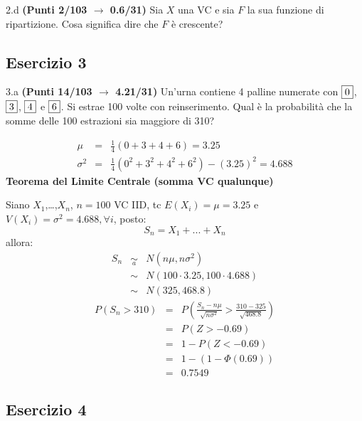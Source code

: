 \documentclass[
  11pt,
]{book}
\theoremstyle{mytheoremstyle}
\theoremstyle{mydefstyle}
\newenvironment{sol}
  {
  \begin{tcolorbox}[enhanced,breakable,arc=0.1mm,boxrule=1pt,colback=white,colframe=iblue,
  title=\bf \fontfamily{lmss}\selectfont \hspace{.5 cm} Soluzione,drop fuzzy shadow]

}{
\end{tcolorbox}
  }
\begin{document}
2.d \textbf{(Punti 2/103 \(\rightarrow\) 0.6/31)} Sia \(X\) una VC e sia \(F\) la sua funzione di ripartizione. Cosa significa dire che \(F\) è crescente?

\subsection{Esercizio 3}\label{esercizio-3-19}

3.a \textbf{(Punti 14/103 \(\rightarrow\) 4.21/31)} Un'urna contiene 4 palline numerate con \(\fbox{0}\), \(\fbox{3}\), \(\fbox{4}\) e \(\fbox{6}\). Si estrae 100 volte con reinserimento. Qual è la probabilità che la somme delle 100 estrazioni sia maggiore di 310?

\begin{sol}
\begin{eqnarray*}
 \mu &=& \frac 1{ 4 }(  0 + 3 + 4 + 6  )= 3.25 \\ 
 \sigma^2 &=& \frac 1{ 4 }(  0 ^2+ 3 ^2+ 4 ^2+ 6 ^2 )-( 3.25 )^2= 4.688 
\end{eqnarray*}
\textbf{Teorema del Limite Centrale (somma VC qualunque)}

Siano \(X_1\),\ldots,\(X_n\), \(n=100\) VC IID, tc \(E(X_i)=\mu=3.25\) e \(V(X_i)=\sigma^2=4.688,\forall i\), posto:
\[
      S_n = X_1 + ... + X_n
      \]
allora:\begin{eqnarray*}
  S_n & \mathop{\sim}\limits_{a}& N(n\mu,n\sigma^2) \\
     &\sim & N(100\cdot3.25,100\cdot4.688) \\
     &\sim & N(325,468.8) 
  \end{eqnarray*}\begin{eqnarray*}
      P( S_n   >   310 ) 
        &=& P\left(  \frac { S_n  -  n\mu }{ \sqrt{n\sigma^2} }  >  \frac { 310  -  325 }{\sqrt{ 468.8 }} \right)  \\
                 &=& P\left(  Z   >   -0.69 \right) \\    &=& 1-P(Z< -0.69 )\\ 
                 &=&  1-(1-\Phi( 0.69 )) \\ &=&  0.7549 
      \end{eqnarray*}

\end{sol}

\subsection{Esercizio 4}\label{esercizio-4-19}
\end{document}
